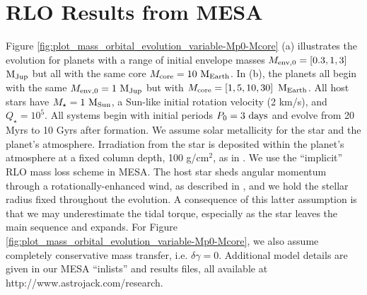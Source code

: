 \documentclass{svjour3}                     %
\begin{document}
\section{RLO Results from MESA}
\label{sec:RLO_Results_from_MESA}
Figure \ref{fig:plot_mass_orbital_evolution_variable-Mp0-Mcore} (a) illustrates the evolution for planets with a range of initial envelope masses $M_{\rm env, 0} = \left[0.3, 1, 3\right]$ ${\rm M_{Jup}}$ but all with the same core $M_{\rm core} = 10\ {\rm M_{Earth}}$. In (b), the planets all begin with the same $M_{\rm env, 0} = 1\ {\rm M_{Jup}}$ but with $M_{\rm core} = \left[1, 5, 10, 30\right]\ {\rm M_{Earth}}$. All host stars have $M_\star = 1\ {\rm M_{Sun}}$, a Sun-like initial rotation velocity (2 km/s), and $Q_\star = 10^5$. All systems begin with initial periods $P_0 = 3\ {\rm days}$ and evolve from 20 Myrs to 10 Gyrs after formation. We assume solar metallicity for the star and the planet's atmosphere. Irradiation from the star is deposited within the planet's atmosphere at a fixed column depth, 100 g/cm$^2$, as in \cite{2015ApJ...813..101V}. We use the ``implicit'' RLO mass loss scheme in MESA. The host star sheds angular momentum through a rotationally-enhanced wind, as described in \cite{2013ApJS..208....4P}, and we hold the stellar radius fixed throughout the evolution. A consequence of this latter assumption is that we may underestimate the tidal torque, especially as the star leaves the main sequence and expands. For Figure \ref{fig:plot_mass_orbital_evolution_variable-Mp0-Mcore}, we also assume completely conservative mass transfer, i.e. $\delta \gamma = 0$. Additional model details are given in our MESA ``inlists'' and results files, all available at http://www.astrojack.com/research.
\end{document}
